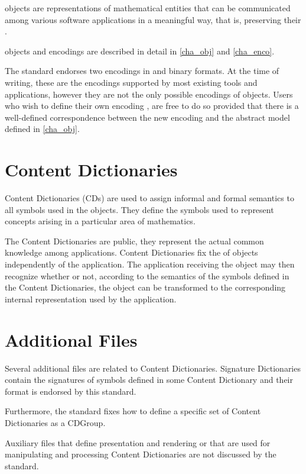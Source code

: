 \OM objects are representations of mathematical entities that
can be communicated among various software applications in a
meaningful way, that is, preserving their
.

\OM objects and encodings are described in detail in \ref{cha_obj} and \ref{cha_enco}.



The standard endorses two encodings in \XML and binary
formats.
At the time of writing, these are the encodings
supported by most existing \OM tools and applications,
however they are not the only possible encodings of \OM
objects. Users who wish to define their own encoding
, are free to
do so provided that there is
a well-defined correspondence
between the new encoding and the abstract model defined in \ref{cha_obj}. 





\section{Content Dictionaries}\label{sec_intro-cd}


Content Dictionaries (CDs) are used to assign informal and formal
semantics to all symbols used in the \OM objects. They define the
symbols used to represent concepts arising in a particular area of
mathematics.


The Content Dictionaries are public, they represent the actual
common knowledge among \OM applications.  Content Dictionaries fix
the  of objects independently of the
application.  The application receiving the object may then recognize
whether or not, according to the semantics of the symbols defined in
the Content Dictionaries, the object can be transformed to the
corresponding internal representation used by the application.

\section{Additional Files}\label{sec_addnfiles} 
Several additional files are related to Content Dictionaries.  Signature Dictionaries
contain the signatures of symbols defined in some \OM Content Dictionary and their format
is endorsed by this standard.

Furthermore, the standard fixes how to define a specific set of Content Dictionaries as a
CDGroup.

Auxiliary files that define presentation and rendering or that are used for manipulating
and processing Content Dictionaries are not discussed by the standard.

